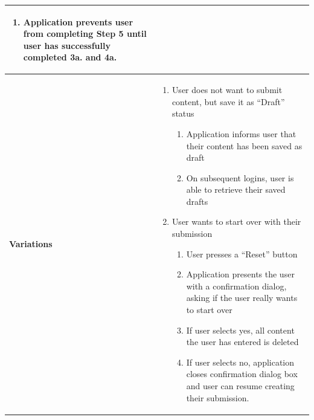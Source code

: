 \documentclass[11pt]{article}
\begin{document}
\begin{centering}
\begin{tabular}{|p{2.5cm}|p{13cm}|}
{\begin{enumerate}
{\begin{enumerate}
                    \item Application prevents user from completing Step 5 until user has \newline successfully completed 3a. and 4a.
                \end{enumerate}
            } 
        \end{enumerate}
        \vspace{-15pt}
    }\\
    \hline
    \textbf{Variations} & \parbox{\textwidth}{
        \begin{enumerate}
            \setlength\itemsep{-3pt}
            \item User does not want to submit content, but save it as ``Draft'' status\\
            \parbox{\textwidth}{
                \begin{enumerate}
                    \setlength\itemsep{-3pt}
                    \item Application informs user that their content has been saved as draft
                    \item On subsequent logins, user is able to retrieve their saved drafts
                \end{enumerate}
            }
            \item User wants to start over with their submission\\
            \parbox{\textwidth}{
                \begin{enumerate}
                    \setlength\itemsep{-3pt}
                    \item User presses a ``Reset'' button
                    \item Application presents the user with a confirmation dialog, asking \newline if the user really wants to start over
                    \item If user selects yes, all content the user has entered is deleted
                    \item If user selects no, application closes confirmation dialog box and \newline user can resume creating their submission.
                \end{enumerate}
            } 
        \end{enumerate}
        \vspace{-15pt}
    }\\
    \hline
\end{tabular}

\end{centering}
\end{document}
